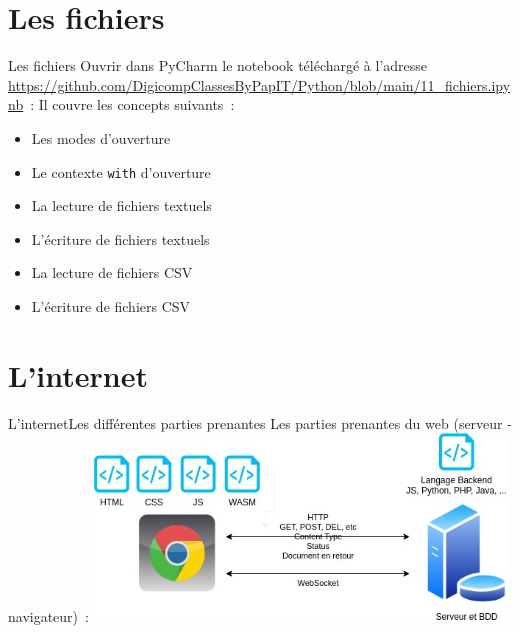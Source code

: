 \documentclass{beamer}
\begin{document}
    \section{Les fichiers}\label{sec:files}

    \begin{frame}{Les fichiers}
        Ouvrir dans PyCharm le notebook téléchargé à l'adresse \url{https://github.com/DigicompClassesByPapIT/Python/blob/main/11_fichiers.ipynb}~:
        \bigbreak
        Il couvre les concepts suivants~:
        \begin{itemize}
            \item Les modes d'ouverture
            \item Le contexte \lstinline{with} d'ouverture
            \item La lecture de fichiers textuels
            \item L'écriture de fichiers textuels
            \item La lecture de fichiers CSV
            \item L'écriture de fichiers CSV
        \end{itemize}
    \end{frame}


    \section{L'internet}\label{sec:internet}

    \begin{frame}{L'internet}{Les différentes parties prenantes}
        Les parties prenantes du web (serveur - navigateur)~:
        \bigbreak
        \centering
        \includegraphics[width=11cm]{image/web-stakeholders}
    \end{frame}
\end{document}
